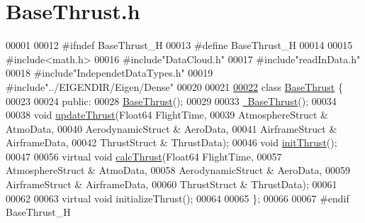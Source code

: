 \hypertarget{_base_thrust_8h_source}{}\section{Base\+Thrust.\+h}
\label{_base_thrust_8h_source}

\begin{DoxyCode}
00001 
00012 \textcolor{preprocessor}{#ifndef BaseThrust\_H}
00013 \textcolor{preprocessor}{#define BaseThrust\_H}
00014 
00015 \textcolor{preprocessor}{#include<math.h>}
00016 \textcolor{preprocessor}{#include"DataCloud.h"}
00017 \textcolor{preprocessor}{#include"readInData.h"}
00018 \textcolor{preprocessor}{#include"IndependetDataTypes.h"}
00019 \textcolor{preprocessor}{#include"../EIGENDIR/Eigen/Dense"}
00020 
00021 
\hyperlink{group___engine}{00022} \textcolor{keyword}{class }\hyperlink{group___engine_class_base_thrust}{BaseThrust} \{
00023 
00024 \textcolor{keyword}{public}:
00028     \hyperlink{group___engine_a19885a6a70bfc4c02e2d8f310af9f22e}{BaseThrust}();
00029 
00033     \hyperlink{group___engine_a554955351c2acfe7a46c00fe056c5c6c}{~BaseThrust}();
00034 
00038     \textcolor{keywordtype}{void} \hyperlink{group___engine_a869359a1b2b7cddcbe5979d6a1cf5eac}{updateThrust}(Float64 FlightTime,
00039                         AtmosphereStruct & AtmoData,
00040                         AerodynamicStruct & AeroData,
00041                         AirframeStruct & AirframeData,
00042                         ThrustStruct & ThrustData);
00046     \textcolor{keywordtype}{void} \hyperlink{group___engine_a1a9a88e6c05cc0b2564522347365900c}{initThrust}();
00047 
00056     \textcolor{keyword}{virtual} \textcolor{keywordtype}{void} \hyperlink{group___engine_ac578e683598739655ce52ea85d97362b}{calcThrust}(Float64 FlightTime,
00057                             AtmosphereStruct & AtmoData,
00058                             AerodynamicStruct & AeroData,
00059                             AirframeStruct & AirframeData,
00060                             ThrustStruct & ThrustData);
00061 
00062 
00063     \textcolor{keyword}{virtual} \textcolor{keywordtype}{void} initializeThrust();
00064 
00065 \};
00066 
00067 \textcolor{preprocessor}{#endif  BaseThrust\_H}
\end{DoxyCode}
